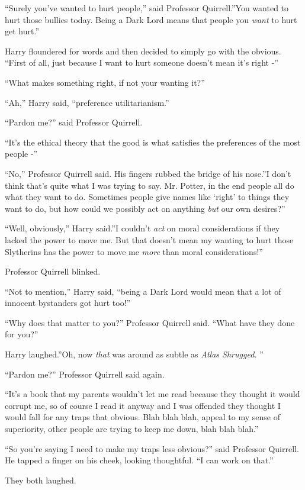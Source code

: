 ``Surely you've wanted to hurt people,'' said Professor Quirrell.''You
wanted to hurt those bullies today. Being a Dark Lord means that people
you \emph{want} to hurt get hurt.''

Harry floundered for words and then decided to simply go with the
obvious. ``First of all, just because I want to hurt someone doesn't
mean it's right -''

``What makes something right, if not your wanting it?''

``Ah,'' Harry said, ``preference utilitarianism.''

``Pardon me?'' said Professor Quirrell.

``It's the ethical theory that the good is what satisfies the
preferences of the most people -''

``No,'' Professor Quirrell said. His fingers rubbed the bridge of his
nose.''I don't think that's quite what I was trying to say. Mr. Potter,
in the end people all do what they want to do. Sometimes people give
names like `right' to things they want to do, but how could we possibly
act on anything \emph{but} our own desires?''

``Well, obviously,'' Harry said.''I couldn't \emph{act} on moral
considerations if they lacked the power to move me. But that doesn't
mean my wanting to hurt those Slytherins has the power to move me
\emph{more} than moral considerations!''

Professor Quirrell blinked.

``Not to mention,'' Harry said, ``being a Dark Lord would mean that a
lot of innocent bystanders got hurt too!''

``Why does that matter to you?'' Professor Quirrell said. ``What have
they done for you?''

Harry laughed.''Oh, now \emph{that} was around as subtle as \emph{Atlas
Shrugged.} ''

``Pardon me?'' Professor Quirrell said again.

``It's a book that my parents wouldn't let me read because they thought
it would corrupt me, so of course I read it anyway and I was offended
they thought I would fall for any traps that obvious. Blah blah blah,
appeal to my sense of superiority, other people are trying to keep me
down, blah blah blah.''

``So you're saying I need to make my traps less obvious?'' said
Professor Quirrell. He tapped a finger on his cheek, looking thoughtful.
``I can work on that.''

They both laughed.

